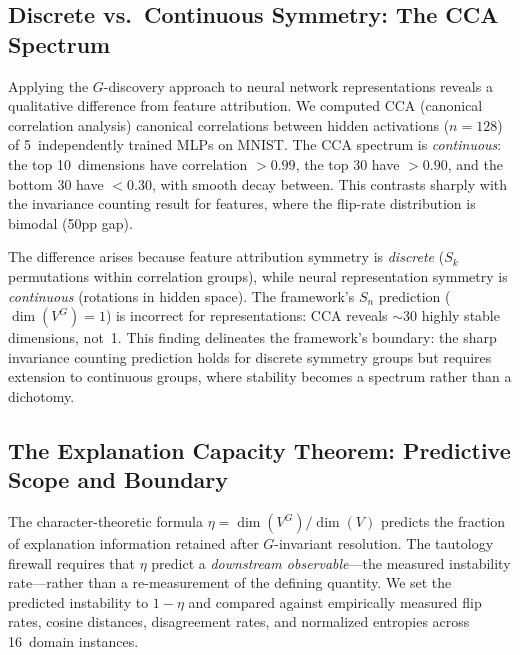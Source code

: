 \documentclass[11pt,a4paper]{article}
\begin{document}
\subsection{Discrete vs.\ Continuous Symmetry: The CCA Spectrum}
\label{sec:cca-spectrum}

Applying the $G$-discovery approach to neural network representations
reveals a qualitative difference from feature attribution.  We computed CCA
(canonical correlation analysis) canonical correlations between hidden
activations ($n = 128$) of 5~independently trained MLPs on MNIST.  The CCA
spectrum is \emph{continuous}: the top 10~dimensions have correlation
$> 0.99$, the top 30 have $> 0.90$, and the bottom 30 have $< 0.30$, with
smooth decay between.  This contrasts sharply with the invariance counting
result for features, where the flip-rate distribution is bimodal (50pp gap).

The difference arises because feature attribution symmetry is
\emph{discrete} ($S_k$ permutations within correlation groups), while
neural representation symmetry is \emph{continuous} (rotations in hidden
space).  The framework's $S_n$ prediction ($\dim(V^G) = 1$) is incorrect
for representations: CCA reveals $\sim\!30$ highly stable dimensions, not~1.
This finding delineates the framework's boundary: the sharp invariance counting
prediction holds for discrete symmetry groups but requires extension to
continuous groups, where stability becomes a spectrum rather than a
dichotomy.

\subsection{The Explanation Capacity Theorem: Predictive Scope and Boundary}
\label{sec:universal-eta}

The character-theoretic formula $\eta = \dim(V^G) / \dim(V)$ predicts the
fraction of explanation information retained after $G$-invariant resolution.
The tautology firewall requires that $\eta$ predict a \emph{downstream
observable}---the measured instability rate---rather than a re-measurement
of the defining quantity.  We set the predicted instability to $1 - \eta$ and
compared against empirically measured flip rates, cosine distances,
disagreement rates, and normalized entropies across 16~domain instances.
\end{document}
